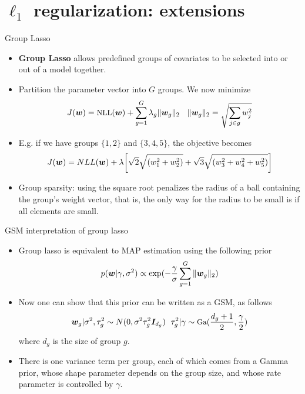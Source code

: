 \documentclass[10pt,mathserif]{beamer}
\begin{document}
\section{$\ell_1$ regularization: extensions}
\begin{frame}{Group Lasso}
\begin{itemize}
    \item \textbf{Group Lasso} allows predefined groups of covariates to be selected into or out of a model together.
    \item Partition the parameter vector into $G$ groups. We now minimize 
    \begin{equation*}\small
      J(\bm{w}) = \text{NLL}(\bm{w}) + \sum_{g=1}^G \lambda_g\|\bm{w}_g\|_2 \ \ \ \|\bm{w}_g\|_2 = \sqrt{\sum_{j\in g}w_j^2}
    \end{equation*}
    \item E.g. if we have groups $\{1, 2\}$ and $\{3, 4, 5\}$, the objective becomes
    \begin{equation*}\small
      J(\bm{w}) = NLL(\bm{w}) + \lambda \bigg[\sqrt{2}\sqrt{(w_1^2+w_2^2)} + \sqrt{3}\sqrt{(w_3^2+w_4^2+w_5^2)}\bigg] 
    \end{equation*}
    \item Group sparsity: using the square root penalizes the radius of a ball containing the group's weight vector, that is, the only way for the radius to be small is if all elements are small. 
\end{itemize}
\end{frame}    

\begin{frame}{GSM interpretation of group lasso}
\begin{itemize}
    \item Group lasso is equivalent to MAP estimation using the following prior
    \begin{equation*}\small
      p(\bm{w}|\gamma, \sigma^2) \propto \exp(-\frac{\gamma}{\sigma}\sum_{g=1}^G \|\bm{w}_g\|_2)
    \end{equation*}
    \item Now one can show that this prior can be written as a GSM, as follows
    \begin{equation*}\small
        \bm{w}_g|\sigma^2,\tau_g^2 \sim N(0,\sigma^2 \tau_g^2 \bm{I}_{d_g} ) \ \ \tau_g^2|\gamma \sim \text{Ga}(\frac{d_g+1}{2},\frac{\gamma}{2})
    \end{equation*}
    where $d_g$ is the size of group $g$. 
    \item There is one variance term per group, each of which comes from a Gamma prior, whose shape parameter depends on the group size, and whose rate parameter is controlled by $\gamma$.
\end{itemize}
\end{frame}    
\end{document}
